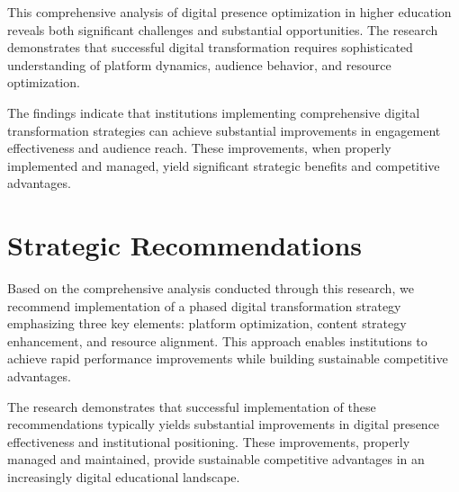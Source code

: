 \documentclass[12pt]{report}
\begin{document}
This comprehensive analysis of digital presence optimization in higher education reveals both significant challenges and substantial opportunities. The research demonstrates that successful digital transformation requires sophisticated understanding of platform dynamics, audience behavior, and resource optimization.

The findings indicate that institutions implementing comprehensive digital transformation strategies can achieve substantial improvements in engagement effectiveness and audience reach. These improvements, when properly implemented and managed, yield significant strategic benefits and competitive advantages.

\section{Strategic Recommendations}

Based on the comprehensive analysis conducted through this research, we recommend implementation of a phased digital transformation strategy emphasizing three key elements: platform optimization, content strategy enhancement, and resource alignment. This approach enables institutions to achieve rapid performance improvements while building sustainable competitive advantages.

The research demonstrates that successful implementation of these recommendations typically yields substantial improvements in digital presence effectiveness and institutional positioning. These improvements, properly managed and maintained, provide sustainable competitive advantages in an increasingly digital educational landscape.
\end{document}
